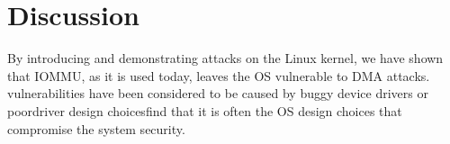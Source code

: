 

\section{Discussion}





By introducing and demonstrating \compound{} attacks on the Linux kernel, we have shown that IOMMU, as it is used today, leaves the OS vulnerable to DMA attacks. \DIFdelbegin {}\DIFdelend \DIFaddbegin {}\DIFaddend vulnerabilities have been considered to be caused by buggy device drivers or poor\DIFdelbegin {}\DIFdelend \DIFaddbegin {}\DIFaddend driver design choices\DIFdelbegin {}\DIFdelend \DIFaddbegin {}\DIFaddend find that it is often the OS design choices that compromise the system security.

